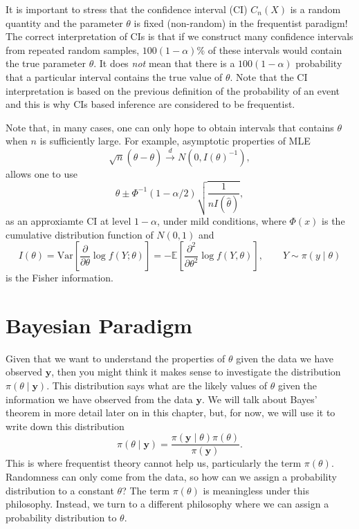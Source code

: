 \documentclass[
]{book}
\theoremstyle{definition}
\theoremstyle{definition}
\theoremstyle{definition}
\theoremstyle{definition}
\theoremstyle{remark}
\begin{document}
It is important to stress that the confidence interval (CI) \(C_n(X)\) is a random quantity and the parameter \(\theta\) is fixed (non-random) in the frequentist paradigm! The correct interpretation of CIs is that if we construct many confidence intervals from repeated random samples, \(100(1-\alpha)\%\) of these intervals would contain the true parameter \(\theta\). It does \emph{not} mean that there is a \(100(1-\alpha)\) probability that a particular interval contains the true value of \(\theta\). Note that the CI interpretation is based on the previous definition of the probability of an event and this is why CIs based inference are considered to be frequentist.

Note that, in many cases, one can only hope to obtain intervals that contains \(\theta\) when \(n\) is sufficiently large. For example, asymptotic properties of MLE
\[
\sqrt{n} (\hat{\theta} - \theta) \overset{d}{\longrightarrow} N(0, I(\theta)^{-1}),
\]
allows one to use
\[
\hat{\theta} \pm \Phi^{-1}{(1-\alpha / 2)} \sqrt{\frac{1}{n I(\hat{\theta})}},
\]
as an approxiamte CI at level \(1-\alpha\), under mild conditions, where \(\Phi(x)\) is the cumulative distribution function of \(N(0,1)\) and
\[
I(\theta) = \mathrm{Var} \left[ \frac{\partial}{\partial \theta} \log f(Y; \theta) \right] = -\mathbb{E} \left[ \frac{\partial^2}{\partial \theta^2} \log f(Y, \theta) \right], \qquad Y \sim \pi(y\mid\theta) 
\]
is the Fisher information.

\section{Bayesian Paradigm}\label{bayesian-paradigm}

Given that we want to understand the properties of \(\theta\) given the data we have observed \(\boldsymbol{y}\), then you might think it makes sense to investigate the distribution \(\pi(\theta \mid \boldsymbol{y})\). This distribution says what are the likely values of \(\theta\) given the information we have observed from the data \(\boldsymbol{y}\). We will talk about Bayes' theorem in more detail later on in this chapter, but, for now, we will use it to write down this distribution
\[
\pi(\theta \mid \boldsymbol{y}) = \frac{\pi(\boldsymbol{y} \mid \theta)\pi(\theta)}{\pi(\boldsymbol{y})}. 
\]
This is where frequentist theory cannot help us, particularly the term \(\pi(\theta)\). Randomness can only come from the data, so how can we assign a probability distribution to a constant \(\theta\)? The term \(\pi(\theta)\) is meaningless under this philosophy. Instead, we turn to a different philosophy where we can assign a probability distribution to \(\theta\).
\end{document}
